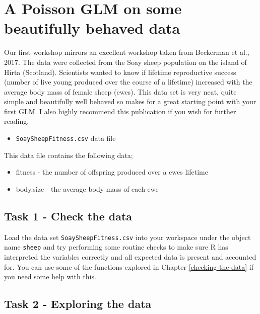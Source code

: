 \documentclass[
]{book}
\providecommand{\tightlist}{%
  \setlength{\itemsep}{0pt}\setlength{\parskip}{0pt}}
\begin{document}
\hypertarget{a-poisson-glm-on-some-beautifully-behaved-data}{%
\section{A Poisson GLM on some beautifully behaved data}\label{a-poisson-glm-on-some-beautifully-behaved-data}}

Our first workshop mirrors an excellent workshop taken from Beckerman et al., 2017. The data were collected from the Soay sheep population on the island of Hirta (Scotland). Scientists wanted to know if lifetime reproductive success (number of live young produced over the course of a lifetime) increased with the average body mass of female sheep (ewes). This data set is very neat, quite simple and beautifully well behaved so makes for a great starting point with your first GLM. I also highly recommend this publication if you wish for further reading.

\begin{itemize}
\tightlist
\item
  \texttt{SoaySheepFitness.csv} data file
\end{itemize}

This data file contains the following data;

\begin{itemize}
\tightlist
\item
  fitness - the number of offspring produced over a ewes lifetime
\item
  body.size - the average body mass of each ewe
\end{itemize}

\hypertarget{task-1---check-the-data}{%
\subsection{Task 1 - Check the data}\label{task-1---check-the-data}}

Load the data set \texttt{SoaySheepFitness.csv} into your workspace under the object name \texttt{sheep} and try performing some routine checks to make sure R has interpreted the variables correctly and all expected data is present and accounted for. You can use some of the functions explored in Chapter \ref{checking-the-data} if you need some help with this.

\hypertarget{task-2---exploring-the-data-3}{%
\subsection{Task 2 - Exploring the data}\label{task-2---exploring-the-data-3}}
\end{document}
